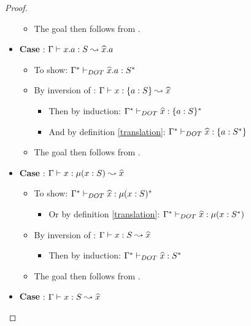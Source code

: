 \begin{proof}
\begin{itemize}
\begin{itemize}
\begin{itemize}
            \end{itemize}
            \item The goal then follows from .
        \end{itemize}
        \item \textbf{Case} : $\Gamma \vdash x.a: S \leadsto \widehat{x}.a$
        \begin{itemize}
            \item To show: $\Gamma^{*} \vdash_{DOT} \widehat{x}.a: S^{*}$
            \item By inversion of :
                $\Gamma \vdash x: \{a : S\} \leadsto \widehat{x}$
            \begin{itemize}
                \item Then by induction:
                    $\Gamma^{*} \vdash_{DOT} \widehat{x}: \{a : S\}^{*}$
                \item And by definition \ref{translation}:
                    $\Gamma^{*} \vdash_{DOT} \widehat{x}: \{a : S^{*}\}$
            \end{itemize}
            \item The goal then follows from .
        \end{itemize}
        \item \textbf{Case} : $\Gamma \vdash x: \mu(x : S) \leadsto \widehat{x}$
        \begin{itemize}
            \item To show: $\Gamma^{*} \vdash_{DOT} \widehat{x}: \mu(x : S)^{*}$
            \begin{itemize}
                \item Or by definition \ref{translation}:
                    $\Gamma^{*} \vdash_{DOT} \widehat{x}: \mu(x : S^{*})$
            \end{itemize}
            \item By inversion of : $\Gamma \vdash x: S \leadsto \widehat{x}$
            \begin{itemize}
                \item Then by induction:
                    $\Gamma^{*} \vdash_{DOT} \widehat{x}: S^{*}$
            \end{itemize}
            \item The goal then follows from .
        \end{itemize}
        \item \textbf{Case} : $\Gamma \vdash x: S \leadsto \widehat{x}$
        \begin{itemize}

\end{itemize}
\end{itemize}
\end{proof}
